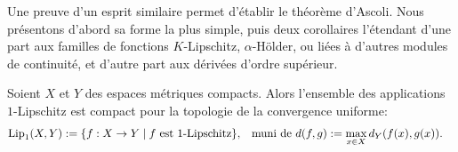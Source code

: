 %
%
%
%
%
%


Une preuve d'un esprit similaire permet d'établir le théorème d'Ascoli. Nous présentons d'abord sa forme la plus simple, puis deux corollaires l'étendant d'une part aux familles de fonctions $K$-Lipschitz, $\alpha$-Hölder, ou liées à d'autres modules de continuité, et d'autre part aux dérivées d'ordre supérieur.
\begin{theorem}[Ascoli]
\label{th:AscoliLip}
%
	Soient $X$ et $Y$ des espaces métriques compacts. Alors l'ensemble des applications $1$-Lipschitz est compact pour la topologie de la convergence uniforme: 
	\begin{align*}
		\operatorname{Lip}_1(X,Y) &:= \{ f:X \to Y \mid f \text{ est $1$-Lipschitz}\},&
		\text{muni de }
		d(f,g) &:= \max_{x \in X} d_Y(f(x), g(x)).
	\end{align*}
\end{theorem}

